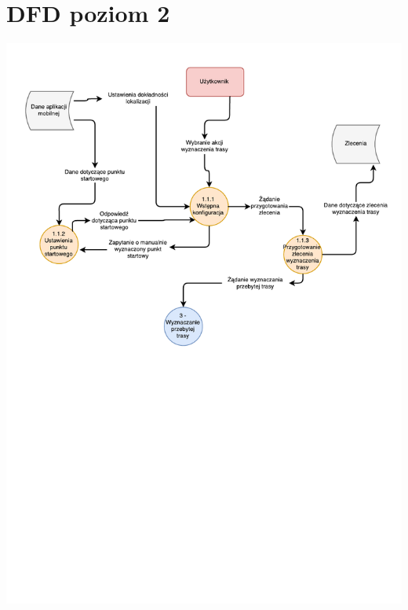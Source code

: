 \documentclass[11pt]{article}
\begin{document}
	\section{DFD poziom 2 }
	\begin{center}
		\includegraphics[scale=0.8]{DFD11.pdf}
	\end{center}
	\newpage
\end{document}
